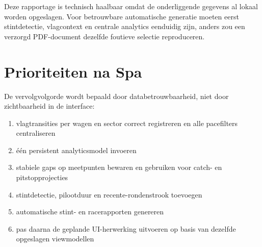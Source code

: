Deze rapportage is technisch haalbaar omdat de onderliggende gegevens al lokaal worden opgeslagen.
Voor betrouwbare automatische generatie moeten eerst stintdetectie, vlagcontext en centrale
analytics eenduidig zijn, anders zou een verzorgd PDF-document dezelfde foutieve selectie
reproduceren.

\section{Prioriteiten na Spa}
De vervolgvolgorde wordt bepaald door databetrouwbaarheid, niet door zichtbaarheid in de interface:

\begin{enumerate}
  \item vlagtransities per wagen en sector correct registreren en alle pacefilters centraliseren
  \item één persistent analyticsmodel invoeren
  \item stabiele gaps op meetpunten bewaren en gebruiken voor catch- en pitstopprojecties
  \item stintdetectie, pilootduur en recente-rondenstrook toevoegen
  \item automatische stint- en racerapporten genereren
  \item pas daarna de geplande UI-herwerking uitvoeren op basis van dezelfde opgeslagen
        viewmodellen
\end{enumerate}

